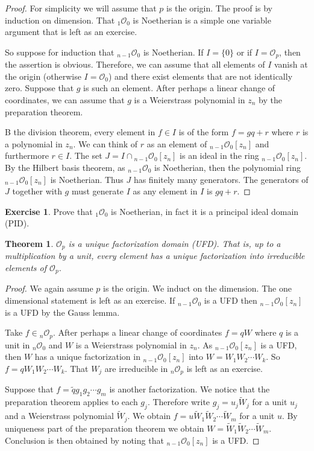 \documentclass[12pt,openany]{book}
\newcommand{\sO}{{\mathcal{O}}}
\theoremstyle{plain}
\newtheorem{thm}{Theorem}[section]
\theoremstyle{remark}
\theoremstyle{definition}
\theoremstyle{exercise}
\newtheorem{exercise}{Exercise}[section]
\theoremstyle{example}
\begin{document}
\begin{proof}
For simplicity we will assume that $p$ is the origin.  The proof is by
induction on dimension.  That ${}_1\sO_0$ is Noetherian is a simple one
variable argument that is left as an exercise.

So suppose for induction that ${}_{n-1}\sO_0$ is Noetherian.  If $I = \{ 0 \}$
or if $I = \sO_p$, then the assertion is obvious.  Therefore, we can assume
that all elements of $I$ vanish at the origin (otherwise $I = \sO_0$) and
there exist elements that are not identically zero.  Suppose that $g$
is such an element.  After perhaps a linear change of coordinates, we can
assume that $g$ is a Weierstrass polynomial in $z_n$
by the preparation theorem.

B the division theorem,
every element in $f \in I$ is of the form $f = gq+r$ where $r$
is a polynomial in $z_n$.  We can think of
$r$ as an element of ${}_{n-1}\sO_0[z_n]$ and furthermore $r \in I$.
The set $J= I \cap {}_{n-1}\sO_0[z_n]$ is an ideal in the
ring ${}_{n-1}\sO_0[z_n]$.  By the Hilbert basis theorem, as
${}_{n-1}\sO_0$ is Noetherian, then the polynomial ring
${}_{n-1}\sO_0[z_n]$ is Noetherian.  Thus $J$ has finitely many generators.
The generators of $J$ together with $g$ must generate $I$ as any
element in $I$ is $gq+r$.
\end{proof}

\begin{exercise}
Prove that ${}_1\sO_0$ is Noetherian, in fact it is a principal ideal domain
(PID).
\end{exercise}

\begin{thm}
$\sO_p$ is a unique factorization domain (UFD).  That is, up to a
multiplication by a unit, every element has a unique factorization into
irreducible elements of $\sO_p$.
\end{thm}

\begin{proof}
We again assume $p$ is the origin.
We induct on the dimension.  The one dimensional statement is left
as an exercise.  If ${}_{n-1}\sO_0$ is a UFD then
${}_{n-1}\sO_0[z_n]$ is a UFD by the Gauss lemma.

Take $f \in {}_n\sO_p$.  After perhaps a linear change of coordinates
$f = qW$ where $q$ is a unit in ${}_n\sO_0$
and $W$ is a Weierstrass polynomial in $z_n$.
As 
${}_{n-1}\sO_0[z_n]$ is a UFD, then $W$ has a unique
factorization in 
${}_{n-1}\sO_0[z_n]$ into $W = W_1 W_2 \cdots W_k$.
So $f = q W_1 W_2 \cdots W_k$.  That $W_j$ are irreducible
in ${}_n\sO_p$ is left as an exercise.

Suppose that
$f = \tilde{q} g_1 g_2 \cdots g_m$ is another factorization.  We notice that
the preparation theorem applies to each $g_j$.  Therefore write
$g_j = u_j \tilde{W}_j$ for a unit $u_j$ and a Weierstrass polynomial
$\tilde{W}_j$.  We obtain
$f = u \tilde{W}_1 \tilde{W}_2 \cdots \tilde{W}_m$ for a unit $u$.  By
uniqueness part of the preparation theorem we obtain
$W = \tilde{W}_1 \tilde{W}_2 \cdots \tilde{W}_m$.  Conclusion is then
obtained by noting that
${}_{n-1}\sO_0[z_n]$ is a UFD.
\end{proof}
\end{document}
